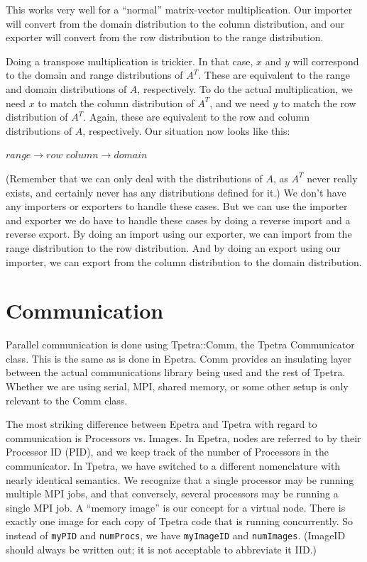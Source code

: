 \documentclass[10pt,relax]{TpetraDesign}
\begin{document}
This works very well for a ``normal'' matrix-vector multiplication. Our importer will convert from the domain distribution to the column distribution, and our exporter will convert from the row distribution to the range distribution. 

Doing a transpose multiplication is trickier. In that case, $x$ and $y$ will correspond to the domain and range distributions of $A^T$. These are equivalent to the range and domain distributions of $A$, respectively. To do the actual multiplication, we need $x$ to match the column distribution of $A^T$, and we need $y$ to match the row distribution of $A^T$. Again, these are equivalent to the row and column distributions of $A$, respectively. Our situation now looks like this:
\begin{center}
$range  \rightarrow row$
\hspace{1cm}
$column \rightarrow domain$
\end{center}

(Remember that we can only deal with the distributions of $A$, as $A^T$ never really exists, and certainly never has any distributions defined for it.) We don't have any importers or exporters to handle these cases. But we can use the importer and exporter we do have to handle these cases by doing a reverse import and a reverse export. By doing an import using our exporter, we can import from the range distribution to the row distribution. And by doing an export using our importer, we can export from the column distribution to the domain distribution.

%
\section{Communication}
Parallel communication is done using Tpetra::Comm, the Tpetra Communicator class. This is the same as is done in Epetra. Comm provides an insulating layer between the actual communications library being used and the rest of Tpetra. Whether we are using serial, MPI, shared memory, or some other setup is only relevant to the Comm class. 

The most striking difference between Epetra and Tpetra with regard to communication is Processors vs. Images. In Epetra, nodes are referred to by their Processor ID (PID), and we keep track of the number of Processors in the communicator. In Tpetra, we have switched to a different nomenclature with nearly identical semantics. We recognize that a single processor may be running multiple MPI jobs, and that conversely, several processors may be running a single MPI job. A ``memory image'' is our concept for a virtual node. There is exactly one image for each copy of Tpetra code that is running concurrently. So instead of \texttt{myPID} and \texttt{numProcs}, we have \texttt{myImageID} and \texttt{numImages}. (ImageID should always be written out; it is not acceptable to abbreviate it IID.)
\end{document}
